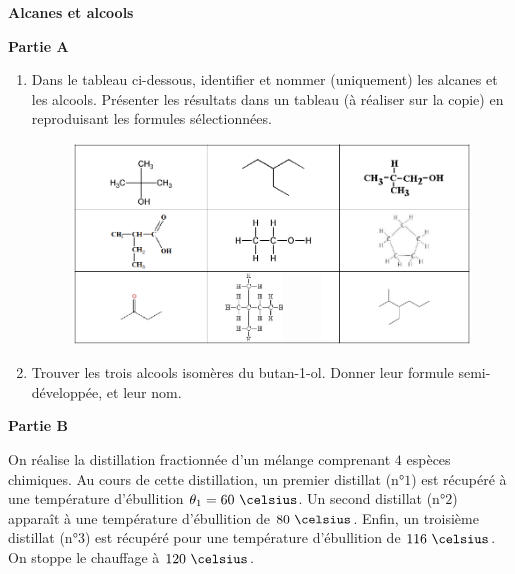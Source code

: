 
\newpage

\exo \textbf{Alcanes et alcools}

\vspace{0.3cm}

\textbf{Partie A}

\begin{enumerate}

\item Dans le tableau ci-dessous, identifier et nommer (uniquement) les alcanes et les alcools. Présenter les résultats dans un tableau (à réaliser sur la copie) en reproduisant les formules
sélectionnées.

\begin{figure}[h]
\begin{center}
\includegraphics[width=\columnwidth]{images/Exo6_Alcanes_Alcools}
\end{center}
\end{figure}

\item Trouver les trois alcools isomères du butan-1-ol. Donner leur formule semi-développée, et leur nom.

\end{enumerate}

\vspace{0.3cm}

\textbf{Partie B}

\vspace{0.3cm}

On réalise la distillation fractionnée d'un mélange comprenant $4$ espèces chimiques. Au cours de cette distillation, un premier distillat (n°$1$) est récupéré à une température d'ébullition $\theta_{1} = 60\text{ }\celsius$. Un second distillat (n°$2$) apparaît à une température d'ébullition de $80\text{ }\celsius$. Enfin, un troisième distillat (n°$3$) est récupéré pour une température d'ébullition de $116\text{ }\celsius$. On stoppe le chauffage à $120\text{ }\celsius$.

